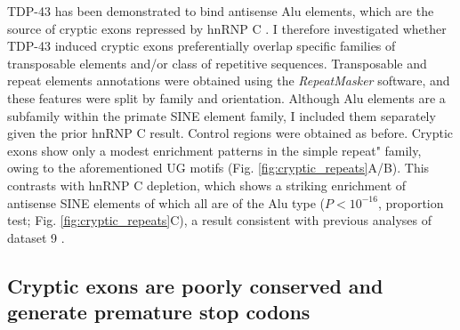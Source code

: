 TDP-43 has been demonstrated to bind antisense Alu elements, which are the source of cryptic exons repressed by hnRNP C \citep{Zarnack2013,Kelley2014-sr}. I therefore investigated whether TDP-43 induced cryptic exons preferentially overlap specific families of transposable elements and/or class of repetitive sequences. Transposable and repeat elements annotations were obtained using the \emph{RepeatMasker} software, and these features were split by family and orientation. Although Alu elements are a subfamily within the primate SINE element family, I included them separately given the prior hnRNP C result.
Control regions were obtained as before. Cryptic exons show only a modest enrichment patterns in the simple repeat" family, owing to the aforementioned UG motifs (Fig. \ref{fig:cryptic_repeats}A/B). This contrasts with hnRNP C depletion, which shows a striking enrichment of antisense SINE elements of which all are of the Alu type ($P < 10^{-16}$, proportion test; Fig. \ref{fig:cryptic_repeats}C), a result consistent with previous analyses of dataset 9 \citep{Zarnack2013}.

\subsection{Cryptic exons are poorly conserved and generate premature stop codons}

